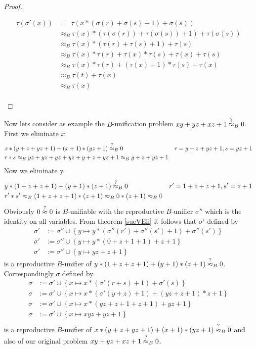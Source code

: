 \begin{proof}
\begin{itemize}
\begin{align*}
		\tau(\sigma'(x))&=\ \ \tau(x*(\sigma(r)+\sigma(s)+1)+\sigma(s))\\
		&\approx_B \tau(x)*(\tau(\sigma(r))+\tau(\sigma(s))+1)+\tau(\sigma(s))\\
		&\approx_B \tau(x)*(\tau(r)+\tau(s)+1)+\tau(s)\\
		&\approx_B \tau(x)*\tau(r)+\tau(x)*\tau(s)+\tau(x)+\tau(s)\\
		&\approx_B \tau(x)*\tau(r)+(\tau(x)+1)*\tau(s)+\tau(x)\\
		&\approx_B \tau(t)+\tau(x)\\
		&\approx_B \tau(x)\\
		\end{align*}
		\end{itemize}
		\end{proof}
		Now lets consider as example the $B$-unification problem $xy+yz+xz+1\stackrel{?}{\approx}_B0$. First we eliminate $x$.
		\begin{align*}
		& x*(y+z+yz+1)+(x+1)*(yz+1)\stackrel{?}{\approx}_B0& r=y+z+yz+1,s=yz+1\\
		& r*s\approx_Byz+yz+yz+yz+y+z+yz+1\approx_By+z+yz+1
		\end{align*}
		Now we eliminate y.
		\begin{align*}
		& y*(1+z+z+1)+(y+1)*(z+1)\stackrel{?}{\approx}_B0& r'=1+z+z+1,s'=z+1\\
		& r'*s'\approx_B(1+z+z+1)*(z+1)\approx_B0*(z+1)\approx_B0
		\end{align*}
		Obviously $0\stackrel{?}{\approx}0$ is $B$-unifiable with the reproductive $B$-unifier $\sigma''$ which is the identity on all variables. From theorem \ref{sucVEli} it follows that $\sigma'$ defined by
		\begin{align*}
		\sigma'&:=\sigma''\cup\left\lbrace y\mapsto y*(\sigma''(r')+\sigma''(s')+1)+\sigma''(s')\right\rbrace\\
		\sigma'&:=\sigma''\cup\left\lbrace y\mapsto y*(0+z+1+1)+z+1\right\rbrace\\
		\sigma'&:=\sigma''\cup\left\lbrace y\mapsto yz+z+1\right\rbrace
		\end{align*}
		is a reproductive $B$-unifier of $y*(1+z+z+1)+(y+1)*(z+1)\stackrel{?}{\approx}_B0$. Correspondingly $\sigma$ defined by
		\begin{align*}
		\sigma&:=\sigma'\cup\left\lbrace x\mapsto x*(\sigma'(r+s)+1)+\sigma'(s)\right\rbrace\\
		\sigma&:=\sigma'\cup\left\lbrace x\mapsto x*(\sigma'(y+z)+1)+(yz+z+1)*z+1\right\rbrace\\
		\sigma&:=\sigma'\cup\left\lbrace x\mapsto x*(yz+z+1+z+1)+yz+1\right\rbrace\\
		\sigma&:=\sigma'\cup\left\lbrace x\mapsto xyz+yz+1\right\rbrace\\
		\end{align*}
		is a reproductive $B$-unifier of $x*(y+z+yz+1)+(x+1)*(yz+1)\stackrel{?}{\approx}_B0$ and also of our original problem $xy+yz+xz+1\stackrel{?}{\approx}_B0$.
